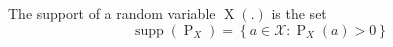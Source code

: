 The support of a random variable $\operatorname{X}(.)$ is the set
$$\operatorname{supp}(\operatorname{P}_X) = \left\{ a \in \mathcal{X} : \operatorname{P}_X(a) >0 \right\}$$
